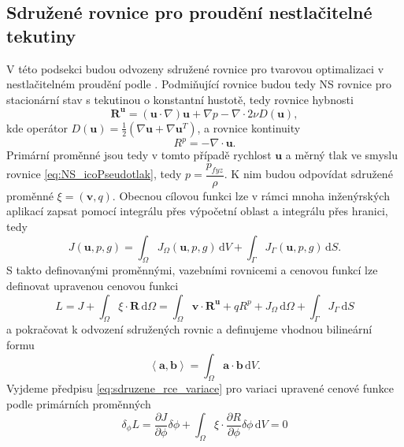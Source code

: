 \subsection{Sdružené rovnice pro proudění nestlačitelné tekutiny}

V této podsekci budou odvozeny sdružené rovnice pro tvarovou optimalizaci v nestlačitelném proudění podle \cite{papadimitriou2007continuous, furst2020mko2}. Podmiňující rovnice budou tedy NS rovnice pro stacionární stav s tekutinou o konstantní hustotě, tedy rovnice hybnosti
\begin{equation}\label{eq:rce_hybnosti}
\mathbf{R^u}=\left(\mathbf{u}\cdot\nabla\right)\mathbf{u} + \nabla p - \nabla \cdot 2 \nu D(\mathbf{u}),
\end{equation}
kde operátor $ D(\mathbf{u})=\frac{1}{2}(\nabla\mathbf{u}+\nabla\mathbf{u}^T) $, a rovnice kontinuity
\begin{equation}
R^p=-\nabla \cdot \mathbf{u}.
\end{equation}\label{eq:rce_kontinuity}
Primární proměnné jsou tedy v tomto případě rychlost $ \mathbf{u} $ a měrný tlak ve smyslu rovnice \ref{eq:NS_icoPseudotlak}, tedy $ p = \dfrac{p_{fyz}}{\rho}$. K nim budou odpovídat sdružené proměnné $ \xi = (\mathbf{v},q) $. Obecnou cílovou funkci lze v rámci mnoha inženýrských aplikací zapsat pomocí integrálu přes výpočetní oblast a integrálu přes hranici, tedy
\begin{equation}\label{eq:cenova_fce}
J(\mathbf{u},p,g)=\int_{\Omega} J_\Omega(\mathbf{u},p,g) \, \mathrm{d}V + \int_{\Gamma}J_\Gamma(\mathbf{u},p,g) \, \mathrm{d}S.
\end{equation}
S takto definovanými proměnnými, vazebními rovnicemi a cenovou funkcí lze definovat upravenou cenovou funkci
\begin{equation}
L= J + \int_\Omega \xi \cdot \mathbf{R} \,\mathrm{d}\Omega 
= \int_\Omega \mathbf{v}\cdot\mathbf{R^u}+ q R^p +J_\Omega  \,\mathrm{d}\Omega + \int_{\Gamma}J_\Gamma \, \mathrm{d}S
\end{equation}
a pokračovat k odvození sdružených rovnic a definujeme vhodnou bilineární formu 
\begin{equation}
\left\langle \mathbf{a},\mathbf{b} \right\rangle = \int_{\Omega} \mathbf{a} \cdot \mathbf{b} \, \mathrm{d}V.
\end{equation} 
Vyjdeme předpisu \ref{eq:sdruzene_rce_variace} pro variaci upravené cenové funkce podle primárních proměnných
\begin{equation} \label{eq:sdruzena_variace}
\delta_\phi L = 
\frac{\partial J}{\partial \phi}\delta\phi
+
\int_{\Omega} 
\xi \cdot \dfrac{\partial R}{\partial \phi}  \delta\phi 
\, \mathrm{d}V
 = 0
\end{equation}
